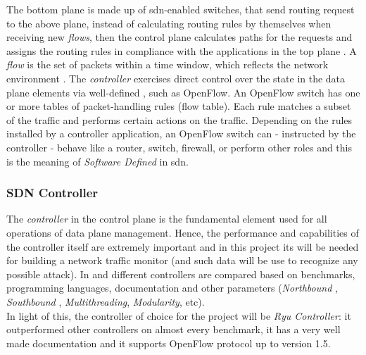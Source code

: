 The bottom plane is made up of \gls{sdn}-enabled switches, that send routing request to the above plane, instead of calculating routing rules by themselves when receiving new \textit{flows}, then the control plane calculates paths for the requests and assigns the routing rules in compliance with the applications in the top plane \cite{Xu2017}. A \textit{flow} is the set of packets within a time window, which reflects the network environment \cite{Liu2019}. The \textit{controller} exercises direct control over the state in the data plane elements via well-defined , such as OpenFlow. An OpenFlow switch has one or more tables of packet-handling rules (flow table). Each rule matches a subset of the traffic and performs certain actions on the traffic. Depending on the rules installed by a controller application, an OpenFlow switch can - instructed by the controller - behave like a router, switch, firewall, or perform other roles and this is the meaning of \textit{Software Defined} in \gls{sdn}.


\subsubsection{SDN Controller}
\label{ssubsec:sdn-controller}

The \textit{controller} in the control plane is the fundamental element used for all operations of data plane management. Hence, the performance and capabilities of the controller itself are extremely important and in this project its  will be needed for building a network traffic monitor (and such data will be use to recognize any possible attack). In \cite{Bondkovskii2016} and \cite{Zhu2019} different controllers are compared based on benchmarks, programming languages, documentation and other parameters (\textit{Northbound }, \textit{Southbound }, \textit{Multithreading}, \textit{Modularity}, etc). \\ In light of this, the controller of choice for the project will be \textit{Ryu Controller}: it outperformed other controllers on almost every benchmark, it has a very well made documentation \cite{RyuDoc} and it supports OpenFlow protocol up to version 1.5.


